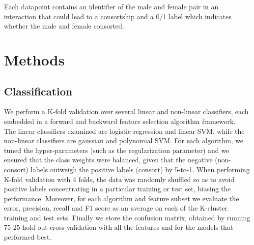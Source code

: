 \documentclass[twoside,twocolumn,paper=letter,fontsize=11pt]{article}
\begin{document}
Each datapoint contains an identifier of the male and female pair in an
interaction that could lead to a consortship and a 0/1 label which indicates
whether the male and female consorted.



\section{Methods}


\subsection{Classification}
We perform a K-fold validation over several linear and non-linear classifiers,
each embedded in a forward and backward feature selection algorithm
framework.\\

The linear classifiers examined are logistic regression and linear SVM, while
the non-linear classifiers are gaussian and polynomial SVM. For each algorithm,
we tuned the hyper-parameters (such as the regularization parameter) and we
ensured that the class weights were balanced, given that the negative
(non-consort) labels outweigh the positive labels (consort) by 5-to-1. When
performing K-fold validation with 4 folds, the data was randomly shuffled so as
to avoid positive labels concentrating in a particular training or test set,
biasing the performance. Moreover, for each algorithm and feature subset we
evaluate the error, precision, recall and F1 score as an average on each of
the K-cluster training and test sets. Finally we store the confusion matrix,
obtained by running 75-25 hold-out cross-validation with all the features and
for the models that performed best.
\end{document}
